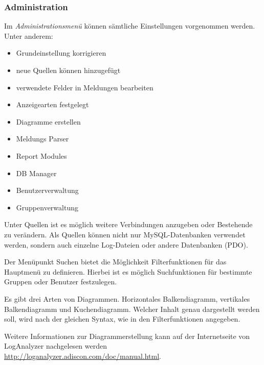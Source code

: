 \subsubsection*{Administration}
Im \textit{Administrationsmenü} können sämtliche Einstellungen vorgenommen werden. Unter anderem:
\begin{itemize}
\item Grundeinstellung korrigieren
\item neue Quellen können hinzugefügt 
\item verwendete Felder in Meldungen bearbeiten 
\item Anzeigearten festgelegt
\item Diagramme erstellen
\item Meldungs Parser 
\item Report Modules 
\item DB Manager
\item Benutzerverwaltung
\item Gruppenverwaltung
\end{itemize}

Unter Quellen ist es möglich weitere Verbindungen anzugeben oder Bestehende zu verändern. Als Quellen können nicht nur MySQL-Datenbanken verwendet werden, sondern auch einzelne Log-Dateien oder andere Datenbanken (PDO).

Der Menüpunkt Suchen bietet die Möglichkeit Filterfunktionen für das Hauptmenü zu definieren. Hierbei ist es möglich Suchfunktionen für bestimmte Gruppen oder Benutzer festzulegen.

Es gibt drei Arten von Diagrammen. Horizontales Balkendiagramm, vertikales Balkendiagramm und Kuchendiagramm. Welcher Inhalt genau dargestellt werden soll, wird nach der gleichen Syntax, wie in den Filterfunktionen angegeben.

Weitere Informationen zur Diagrammerstellung kann auf der Internetseite von LogAnalyzer nachgelesen werden \url{http://loganalyzer.adiscon.com/doc/manual.html}.